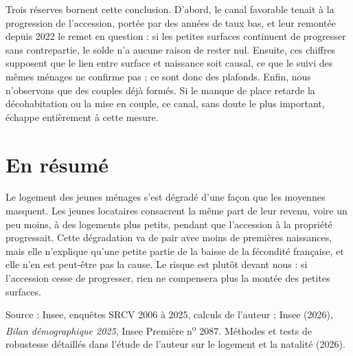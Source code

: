 \documentclass[11pt,a4paper]{article}
\begin{document}
Trois réserves bornent cette conclusion. D'abord, le canal favorable tenait à la progression de l'accession, portée par des années de taux bas, et leur remontée depuis 2022 le remet en question : si les petites surfaces continuent de progresser sans contrepartie, le solde n'a aucune raison de rester nul. Ensuite, ces chiffres supposent que le lien entre surface et naissance soit causal, ce que le suivi des mêmes ménages ne confirme pas ; ce sont donc des plafonds. Enfin, nous n'observons que des couples déjà formés. Si le manque de place retarde la décohabitation ou la mise en couple, ce canal, sans doute le plus important, échappe entièrement à cette mesure.

\section*{\normalsize En résumé}
\vspace{-0.3em}
Le logement des jeunes ménages s'est dégradé d'une façon que les moyennes masquent. Les jeunes locataires consacrent la même part de leur revenu, voire un peu moins, à des logements plus petits, pendant que l'accession à la propriété progressait. Cette dégradation va de pair avec moins de premières naissances, mais elle n'explique qu'une petite partie de la baisse de la fécondité française, et elle n'en est peut-être pas la cause. Le risque est plutôt devant nous : si l'accession cesse de progresser, rien ne compensera plus la montée des petites surfaces.

\vspace{0.3em}
{\scriptsize\color{brandgrey} Source : Insee, enquêtes SRCV 2006 à 2025, calculs de l'auteur ; Insee (2026), \textit{Bilan démographique 2025}, Insee Première n\textsuperscript{o} 2087. Méthodes et tests de robustesse détaillés dans l'étude de l'auteur sur le logement et la natalité (2026).\par}
\end{document}
